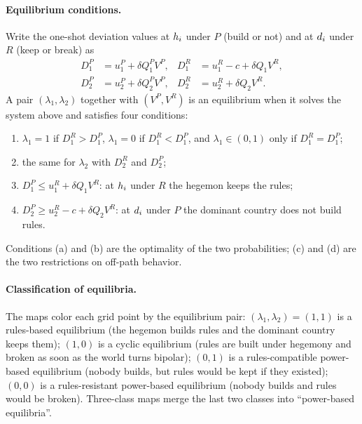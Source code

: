 \paragraph*{Equilibrium conditions.}
Write the one-shot deviation values at $h_i$ under $P$ (build or not) and at
$d_i$ under $R$ (keep or break) as
\begin{align*}
  D^P_1 &= u^P_1 + \delta Q^P_1 V^P, & D^R_1 &= u^R_1 - c + \delta Q_1 V^R, \\
  D^P_2 &= u^P_2 + \delta Q^P_2 V^P, & D^R_2 &= u^R_2 + \delta Q_2 V^R.
\end{align*}
A pair $(\lambda_1, \lambda_2)$ together with $(V^P, V^R)$ is an equilibrium
when it solves the system above and satisfies four conditions:
\begin{enumerate}
  \item[(a)] $\lambda_1 = 1$ if $D^R_1 > D^P_1$, $\lambda_1 = 0$ if $D^R_1 < D^P_1$, and $\lambda_1 \in (0,1)$ only if $D^R_1 = D^P_1$;
  \item[(b)] the same for $\lambda_2$ with $D^R_2$ and $D^P_2$;
  \item[(c)] $D^P_1 \leq u^R_1 + \delta Q_1 V^R$: at $h_i$ under $R$ the hegemon keeps the rules;
  \item[(d)] $D^P_2 \geq u^R_2 - c + \delta Q_2 V^R$: at $d_i$ under $P$ the dominant country does not build rules.
\end{enumerate}
Conditions (a) and (b) are the optimality of the two probabilities; (c) and
(d) are the two restrictions on off-path behavior.

\paragraph*{Classification of equilibria.}
The maps color each grid point by the equilibrium pair:
$(\lambda_1, \lambda_2) = (1, 1)$ is a rules-based equilibrium (the hegemon
builds rules and the dominant country keeps them); $(1, 0)$ is a cyclic
equilibrium (rules are built under hegemony and broken as soon as the world
turns bipolar); $(0, 1)$ is a rules-compatible power-based equilibrium
(nobody builds, but rules would be kept if they existed); $(0, 0)$ is a
rules-resistant power-based equilibrium (nobody builds and rules would be
broken). Three-class maps merge the last two classes into ``power-based
equilibria''.

